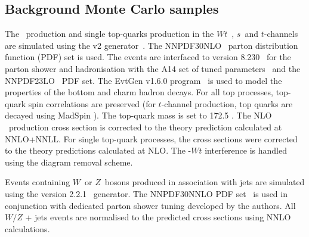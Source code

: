 
\subsection{Background Monte Carlo samples}
\label{sec:data_backgrounds}

The \ttbar\ production and single top-quarks production in the $Wt$~, $s$~and $t$-channels are simulated using the \POWHEGBOX v2 generator~\cite{Powheg1, Powheg2, Powheg3}. The NNPDF30NLO~\cite{NNPDF} parton distribution function (PDF) set is used. The events are interfaced to  version  8.230~\cite{PYTHIA82} for the parton shower and hadronisation with the A14 set of tuned parameters~\cite{A14tune, ATLAS:2012uec} and the NNPDF23LO~\cite{NNPDF23PDFSet} PDF set. The EvtGen v1.6.0 program~\cite{EvtGen} is used to model the properties of the bottom and charm hadron decays. For all top processes, top-quark spin correlations are preserved (for $t$-channel production, top quarks are decayed using MadSpin \cite{MadSpin}). The top-quark mass is set to 172.5 \GeV.  The NLO \ttbar\ production cross section is corrected to the theory prediction calculated at NNLO+NNLL. For single top-quark processes, the cross sections were corrected to the theory predictions calculated at NLO. The \ttbar-$Wt$ interference is handled using the diagram removal scheme.
 
Events containing $W$\ or $Z$\ bosons produced in association with jets are simulated using the \SHERPA version 2.2.1~\cite{Bothmann:2019yzt} generator. The NNPDF30NNLO PDF set~\cite{NNPDF} is used in conjunction with dedicated parton shower tuning developed by the \SHERPA authors.  All $W/Z$ + jets events are normalised to the predicted cross sections using NNLO calculations.

